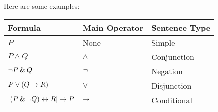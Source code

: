 Here are some examples:

\begin{table}[h]
\begin{tabular}{@{}lll@{}}
  \toprule
Formula                                  & Main Operator & Sentence Type \\ \midrule
\(P\)                                    & None          & Simple        \\
\(P \land Q\)                            & $\land$       & Conjunction   \\
\(\neg P \mathbin{\&} Q\)                      & $\neg$       & Negation      \\
\(P \vee (Q \rightarrow R)\)                    & $\vee$        & Disjunction   \\
\( [(P \mathbin{\&}  \neg Q) \leftrightarrow R] \rightarrow P\) & $\rightarrow$        & Conditional  
\end{tabular}
\end{table}


